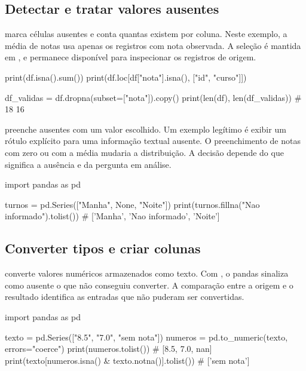 \subsection{Detectar e tratar valores ausentes}
\label{sec:ausentes}

 marca células ausentes e  conta quantas existem por coluna. Neste exemplo, a média de notas usa apenas os registros com nota observada. A seleção é mantida em , e  permanece disponível para inspecionar os registros de origem.

\begin{exemplo}
print(df.isna().sum())
print(df.loc[df["nota"].isna(), ["id", "curso"]])

df_validas = df.dropna(subset=["nota"]).copy()
print(len(df), len(df_validas))  # 18 16
\end{exemplo}

 preenche ausentes com um valor escolhido. Um exemplo legítimo é exibir um rótulo explícito para uma informação textual ausente. O preenchimento de notas com zero ou com a média mudaria a distribuição. A decisão depende do que significa a ausência e da pergunta em análise.

\begin{exemplo}
import pandas as pd

turnos = pd.Series(["Manha", None, "Noite"])
print(turnos.fillna("Nao informado").tolist())
# ['Manha', 'Nao informado', 'Noite']
\end{exemplo}

\subsection{Converter tipos e criar colunas}

 converte valores numéricos armazenados como texto. Com , o pandas sinaliza como ausente o que não conseguiu converter. A comparação entre a origem e o resultado identifica as entradas que não puderam ser convertidas.

\begin{exemplo}
import pandas as pd

texto = pd.Series(["8.5", "7.0", "sem nota"])
numeros = pd.to_numeric(texto, errors="coerce")
print(numeros.tolist())  # [8.5, 7.0, nan]
print(texto[numeros.isna() & texto.notna()].tolist())  # ['sem nota']
\end{exemplo}

